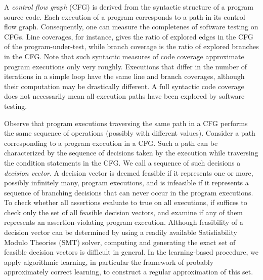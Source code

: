 A \emph{control flow graph} (CFG) is derived from the syntactic structure of a program source code. Each execution of a program corresponds to a path in its control flow graph. Consequently, one can measure the completenes of software testing on CFGs. Line coverages, for instance, gives the ratio of explored edges in the CFG of the program-under-test, while branch coverage is the ratio of explored branches in the CFG. Note that such syntactic measures of code coverage approximate program executions only very roughly. Executions that differ in the number of iterations in a simple loop have the same line and branch coverages, although their computation may be drastically different. A full syntactic code coverage does not necessarily mean all execution paths have been explored by software testing.

Observe that program executions traversing the same path in a CFG performs the same sequence of operations (possibly with different values). Consider a path corresponding to a program execution in a CFG. Such a path can be characterized by the sequence of decisions taken by the execution while traversing the condition statements in the CFG. We call a sequence of such decisions a \emph{decision vector}. A decision vector is deemed feasible if it represents one or more, possibly infinitely many, program executions, and is infeasible if it represents a sequence of branching decisions that can never occur in the program executions. To check whether all assertions evaluate to true on all executions, if suffices to check only the set of all feasible decision vectors, and examine if any of them represents an assertion-violating program execution. Although feasibility of a decision vector can be determined by using a readily available Satisfiability Modulo Theories (SMT) solver, computing and generating the exact set of feasible decision vectors is difficult in general. In the learning-based procedure, we apply algorithmic learning, in particular the framework of probably approximately correct learning, to construct a regular approximation of this set.

